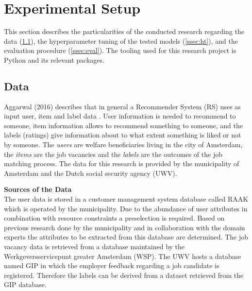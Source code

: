 \section{Experimental Setup}
\label{sec:setup}
This section describes the particularities of the conducted research regarding the data (\ref{ssec:data}), the hyperparameter tuning of the tested models (\ref{ssec:ht}), and the evaluation procedure (\ref{ssec:eval}). 
The tooling used for this research project is Python and its relevant packages.

\subsection{Data}
\label{ssec:data}
Aggarwal (2016) describes that in general a Recommender System (RS) uses as input user, item and label data \cite{aggarwal2016recommender}.
User information is needed to recommend to someone, item information allows to recommend something to someone, and the labels (ratings) give information about to what extent  something is liked or not by someone.
The \textit{users} are welfare beneficiaries living in the city of Amsterdam, the \textit{items} are the job vacancies and the \textit{labels} are the outcomes of the job matching process.
The data for this research is provided by the municipality of Amsterdam and the Dutch social security agency (UWV).

\noindent
\textbf{Sources of the Data}\\
The user data is stored in a customer management system database called RAAK which is operated by the municipality.
Due to the abundance of user attributes in combination with resource constraints a preselection is required. 
Based on previous research done by the municipality and in collaboration with the domain experts the attributes to be extracted from this database are determined. 
The job vacancy data is retrieved from a database maintained by the Werkgeversservicepunt greater Amsterdam (WSP).
The UWV hosts a database named GIP in which the employer feedback regarding a job candidate is registered.
Therefore the labels can be derived from a dataset retrieved from the GIP database.

